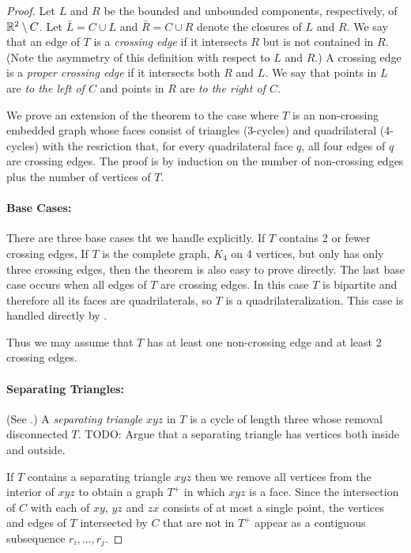 \documentclass{patmorin}
\begin{document}
\begin{proof}
   Let $L$ and $R$ be the bounded
   and unbounded components, respectively, of $\mathbb{R}^2\setminus C$. Let
   $\bar{L}=C\cup L$ and $\bar{R}=C\cup R$ denote the closures of $L$
   and $R$.  We say that an edge of $T$ is a \emph{crossing edge} if
   it intersects $R$ but is not contained in $R$.  (Note the asymmetry
   of this definition with respect to $L$ and $R$.)  A crossing edge
   is a \emph{proper crossing edge} if it intersects both $R$ and $L$.
   We say that points in $L$ are \emph{to the left of $C$} and points
   in $R$ are \emph{to the right of $C$}.

   We prove an extension of the theorem to the case where $T$ is an
   non-crossing embedded graph whose faces consist of triangles (3-cycles)
   and quadrilateral (4-cycles) with the resriction that, for every
   quadrilateral face $q$, all four edges of $q$ are crossing edges.
   The proof is by induction on the number of non-crossing edges plus the
   number of vertices of $T$.

   \paragraph{Base Cases:}
   There are three base cases tht we handle explicitly.  If $T$ contains
   2 or fewer crossing edges, If $T$ is the complete graph, $K_4$ on 4
   vertices, but only has only three crossing edges, then the theorem is
   also easy to prove directly.  The last base case occurs when all edges
   of $T$ are crossing edges.  In this case $T$ is bipartite and therefore
   all its faces are quadrilaterals, so $T$ is a quadrilateralization.
   This case is handled directly by .

   Thus we may assume that $T$ has at least one non-crossing edge and
   at least 2 crossing edges.

   \paragraph{Separating Triangles:}
   (See .)
   A \emph{separating triangle} $xyz$ in $T$ is a cycle of length three
   whose removal disconnected $T$.  TODO: Argue that a separating triangle
   has vertices both inside and outside.

   If $T$ contains a separating triangle $xyz$ then we remove all vertices
   from the interior of $xyz$ to obtain a graph $T^+$ in which
   $xyz$ is a face.  Since the intersection of $C$ with each of $xy$,
   $yz$ and $zx$ consists of at most a single point, the vertices and
   edges of $T$ intersected by $C$ that are not in $T^+$ appear as a
   contiguous subsequence $r_i,\ldots,r_j$.


\end{proof}
\end{document}

